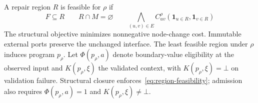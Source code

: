 A repair region $R$ is feasible for $\rho$ if
\begin{equation}
 F\subseteq R\qquad R\cap M=\varnothing\qquad
 \bigwedge_{(u,v)\in E}C^{\rho}_{uv}(\mathbf{1}_{u\in R},\mathbf{1}_{v\in R})
 \label{eq:region-feasibility}
\end{equation}
The structural objective minimizes nonnegative node-change cost. Immutable
external ports preserve the unchanged interface. The least feasible region
under $\rho$ induces program $p_{\rho}$.
Let $\Phi(p_{\rho},a)$ denote boundary-value eligibility at the observed input and
$K(p_{\rho},\xi)$ the validated context, with $K(p_{\rho},\xi)=\bot$ on
validation failure. Structural closure enforces~\eqref{eq:region-feasibility};
admission also requires $\Phi(p_{\rho},a)=1$ and $K(p_{\rho},\xi)\ne\bot$.
